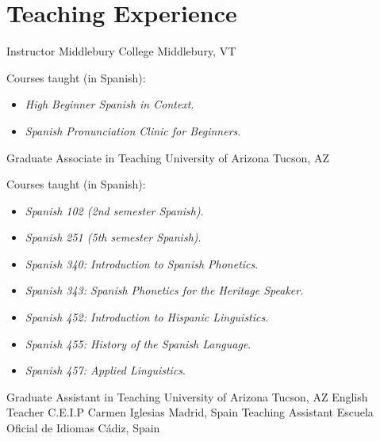 \documentclass[11pt,letterpaper]{moderncv}
\begin{document}
\section{Teaching Experience}

        {Instructor}
        {Middlebury College}
        {Middlebury, VT}
        {}
        {Courses taught (in Spanish):
        \begin{itemize}
          \item[] \small \emph{High Beginner Spanish in Context}.\vspace{-.03in}
          \item[] \small \emph{Spanish Pronunciation Clinic for Beginners}.
        \end{itemize}}
        {Graduate Associate in Teaching}
        {University of Arizona}
        {Tucson, AZ}
        {}
        {Courses taught (in Spanish):
        \begin{itemize}
          \item[] \small \emph{Spanish 102 (2nd semester Spanish)}.\vspace{-.03in}
          \item[] \small \emph{Spanish 251 (5th semester Spanish)}.\vspace{-.03in}
          \item[] \small \emph{Spanish 340: Introduction to Spanish Phonetics}.\vspace{-.03in}
          \item[] \small \emph{Spanish 343: Spanish Phonetics for the Heritage Speaker}.\vspace{-.03in}
          \item[] \small \emph{Spanish 452: Introduction to Hispanic Linguistics}.\vspace{-.03in}
          \item[] \small \emph{Spanish 455: History of the Spanish Language}.\vspace{-.03in}
          \item[] \small \emph{Spanish 457: Applied Linguistics}.
        \end{itemize}}
        {}
        {Graduate Assistant in Teaching}
        {University of Arizona}
        {Tucson, AZ}
        {}
        {}
        {English Teacher}
        {C.E.I.P Carmen Iglesias}
        {Madrid, Spain}
        {}
        {}
        {Teaching Assistant}
        {Escuela Oficial de Idiomas}
        {C\'adiz, Spain}
        {}
        {}
\end{document}
